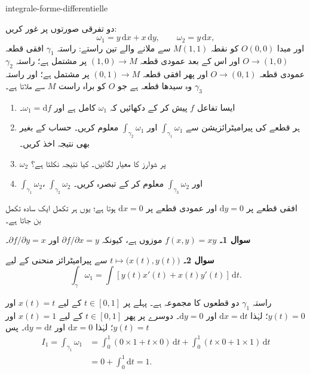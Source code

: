 
\begin{exo}{integrale-forme-differentielle}

دو تفرقی صورتوں پر غور کریں:
\[
\omega_1 = y\,\mathrm{d}x + x\,\mathrm{d}y,
\qquad
\omega_2 = y\,\mathrm{d}x,
\]
اور مبدا $O(0,0)$ کو نقطہ $M(1,1)$ سے ملانے والے تین راستے: راستہ
$\gamma_1$ افقی قطعہ $O\to(1,0)$ اور اس کے بعد عمودی قطعہ $(1,0)\to M$
پر مشتمل ہے؛ راستہ $\gamma_2$ عمودی قطعہ $O\to(0,1)$ اور پھر افقی قطعہ
$(0,1)\to M$ پر مشتمل ہے؛ اور راستہ $\gamma_3$ وہ سیدھا قطعہ ہے جو $O$ کو
براہ راست $M$ سے ملاتا ہے۔

\begin{enumerate}
\item ایسا تفاعل $f$ پیش کر کے دکھائیں کہ $\omega_1$ کامل ہے اور $\omega_1=\mathrm{d}f$۔
\item ہر قطعے کی پیرامیٹرائزیشن سے $\int_{\gamma_1}\omega_1$ اور $\int_{\gamma_2}\omega_1$ معلوم کریں۔ حساب کے بغیر بھی نتیجہ اخذ کریں۔
\item $\omega_2$ پر شوارز کا معیار لگائیں۔ کیا نتیجہ نکلتا ہے؟
\item $\int_{\gamma_1}\omega_2$، $\int_{\gamma_2}\omega_2$ اور $\int_{\gamma_3}\omega_2$ معلوم کر کے تبصرہ کریں۔
\end{enumerate}

\begin{indication}
افقی قطعے پر $\mathrm{d}y=0$ اور عمودی قطعے پر $\mathrm{d}x=0$ ہوتا ہے؛
یوں ہر تکمل ایک سادہ تکمل بن جاتا ہے۔
\end{indication}

\begin{solution}
\textbf{سوال 1۔} $f(x,y)=xy$ موزوں ہے، کیونکہ $\partial f/\partial x=y$ اور $\partial f/\partial y=x$۔

\textbf{سوال 2۔} $t\mapsto\bigl(x(t),y(t)\bigr)$ سے پیرامیٹرائز منحنی کے لیے
\[
\int_\gamma\omega_1
= \int \left[y(t)x'(t)+x(t)y'(t)\right]\,\mathrm{d}t.
\]

راستہ $\gamma_1$ دو قطعوں کا مجموعہ ہے۔ پہلے پر $t\in[0,1]$ کے لیے
$x(t)=t$ اور $y(t)=0$؛ لہٰذا $\mathrm{d}x=\mathrm{d}t$ اور
$\mathrm{d}y=0$۔ دوسرے پر پھر $t\in[0,1]$ کے لیے $x(t)=1$ اور $y(t)=t$؛
لہٰذا $\mathrm{d}x=0$ اور $\mathrm{d}y=\mathrm{d}t$۔ پس
\[
\begin{aligned}
I_1
= \int_{\gamma_1}\omega_1
&= \int_0^1\left(0\times 1+t\times 0\right)\,\mathrm{d}t
 + \int_0^1\left(t\times 0+1\times 1\right)\,\mathrm{d}t \\
&= 0+\int_0^1\mathrm{d}t = 1.
\end{aligned}
\]


\end{solution}
\end{exo}
